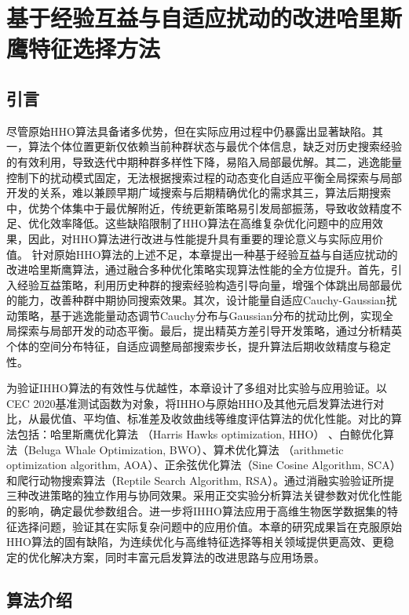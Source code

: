 \documentclass{wzuthesis}
\begin{document}
\chapter{基于经验互益与自适应扰动的改进哈里斯鹰特征选择方法}

\section{引言}
尽管原始HHO算法具备诸多优势，但在实际应用过程中仍暴露出显著缺陷。其一，算法个体位置更新仅依赖当前种群状态与最优个体信息，缺乏对历史搜索经验的有效利用，导致迭代中期种群多样性下降，易陷入局部最优解。其二，逃逸能量控制下的扰动模式固定，无法根据搜索过程的动态变化自适应平衡全局探索与局部开发的关系，难以兼顾早期广域搜索与后期精确优化的需求其三，算法后期搜索中，优势个体集中于最优解附近，传统更新策略易引发局部振荡，导致收敛精度不足、优化效率降低。这些缺陷限制了HHO算法在高维复杂优化问题中的应用效果，因此，对HHO算法进行改进与性能提升具有重要的理论意义与实际应用价值。
针对原始HHO算法的上述不足，本章提出一种基于经验互益与自适应扰动的改进哈里斯鹰算法，通过融合多种优化策略实现算法性能的全方位提升。首先，引入经验互益策略，利用历史种群的搜索经验构造引导向量，增强个体跳出局部最优的能力，改善种群中期协同搜索效果。其次，设计能量自适应Cauchy-Gaussian扰动策略，基于逃逸能量动态调节Cauchy分布与Gaussian分布的扰动比例，实现全局探索与局部开发的动态平衡。最后，提出精英方差引导开发策略，通过分析精英个体的空间分布特征，自适应调整局部搜索步长，提升算法后期收敛精度与稳定性。

为验证IHHO算法的有效性与优越性，本章设计了多组对比实验与应用验证。以CEC 2020基准测试函数为对象，将IHHO与原始HHO及其他元启发算法进行对比，从最优值、平均值、标准差及收敛曲线等维度评估算法的优化性能。对比的算法包括：哈里斯鹰优化算法 （Harris Hawks optimization, HHO） 、白鲸优化算法（Beluga Whale Optimization, BWO）、算术优化算法 （arithmetic optimization algorithm, AOA）、正余弦优化算法（Sine Cosine Algorithm, SCA）和爬行动物搜索算法（Reptile Search Algorithm, RSA）。通过消融实验验证所提三种改进策略的独立作用与协同效果。采用正交实验分析算法关键参数对优化性能的影响，确定最优参数组合。进一步将IHHO算法应用于高维生物医学数据集的特征选择问题，验证其在实际复杂问题中的应用价值。本章的研究成果旨在克服原始HHO算法的固有缺陷，为连续优化与高维特征选择等相关领域提供更高效、更稳定的优化解决方案，同时丰富元启发算法的改进思路与应用场景。

\section{算法介绍}
\end{document}
